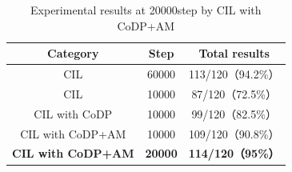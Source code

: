\begin{table}[hbtp]
  \caption{Experimental results at 20000step by CIL with CoDP+AM}
  \label{table:result5}
  \centering
  \begin{tabular}{|c|c|c|}
    \hline
    Category & Step & Total results\\
    \hline
    CIL & 60000 & 113/120（94.2\%）\\
    \hline
    CIL & 10000 & 87/120（72.5\%）\\
    \hline
    CIL with CoDP & 10000 & 99/120（82.5\%）\\
    \hline
    CIL with CoDP+AM & 10000 & 109/120（90.8\%）\\
    \hline
      \textbf{CIL with CoDP+AM}
     & \textbf{20000} & \textbf{114/120（95\%）}\\
    \hline
  \end{tabular}
\end{table}

\newpage
